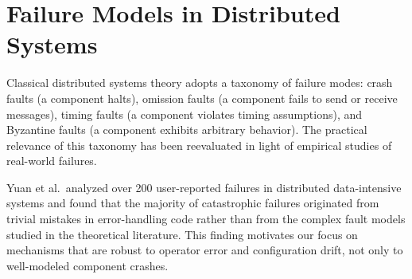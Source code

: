 \section{Failure Models in Distributed Systems}

Classical distributed systems theory adopts a taxonomy of failure modes: crash faults (a component halts), omission faults (a component fails to send or receive messages), timing faults (a component violates timing assumptions), and Byzantine faults (a component exhibits arbitrary behavior). The practical relevance of this taxonomy has been reevaluated in light of empirical studies of real-world failures.

Yuan et al.\ analyzed over 200 user-reported failures in distributed data-intensive systems and found that the majority of catastrophic failures originated from trivial mistakes in error-handling code rather than from the complex fault models studied in the theoretical literature. This finding motivates our focus on mechanisms that are robust to operator error and configuration drift, not only to well-modeled component crashes.
